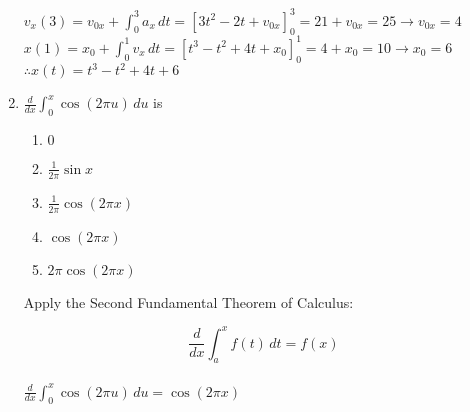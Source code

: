 \documentclass[10pt, letterpaper]{report}
\begin{document}
\begin{enumerate}
    $v_{x}(3)=v_{0x}+\int_{0}^{3}{a_{x}}\,dt=[3t^{2}-2t+v_{0x}]_{0}^{3}=21+v_{0x}=25\rightarrow v_{0x}=4$ \\

    $x(1)=x_{0}+\int_{0}^{1}{v_{x}}\,dt=[t^{3}-t^{2}+4t+x_{0}]_{0}^{1}=
    4+x_{0}=10\rightarrow x_{0}=6$ \\

    $\therefore x(t)=t^{3}-t^{2}+4t+6$ \\

    \hline
  \item{$\frac{d}{dx}\int_{0}^{x}{\cos{(2\pi u)}}\,du$ is}
    \begin{enumerate}
      \item{$0$}
      \item{$\frac{1}{2\pi}\sin{x}$}
      \item{$\frac{1}{2\pi}\cos{(2\pi x)}$}
      \item{$\cos{(2\pi x)}$}
      \item{$2\pi\cos{(2\pi x)}$} \\
    \end{enumerate}

    Apply the Second Fundamental Theorem of Calculus:

    $$ \frac{d}{dx}\int_{a}^{x}{f(t)}\,dt=f(x) $$ \\

    $\frac{d}{dx}\int_{0}^{x}{\cos{(2\pi u)}}\,du=\cos{(2\pi x)}$ \\

\end{enumerate}
\end{document}
